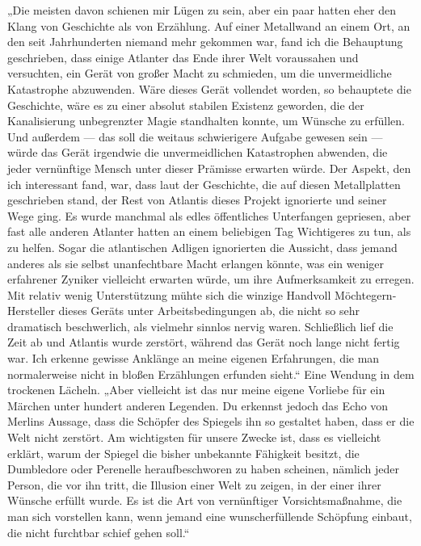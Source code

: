 „Die meisten davon schienen mir Lügen zu sein, aber ein paar hatten eher den Klang von Geschichte als von Erzählung. Auf einer Metallwand an einem Ort, an den seit Jahrhunderten niemand mehr gekommen war, fand ich die Behauptung geschrieben, dass einige Atlanter das Ende ihrer Welt voraussahen und versuchten, ein Gerät von großer Macht zu schmieden, um die unvermeidliche Katastrophe abzuwenden. Wäre dieses Gerät vollendet worden, so behauptete die Geschichte, wäre es zu einer absolut stabilen Existenz geworden, die der Kanalisierung unbegrenzter Magie standhalten konnte, um Wünsche zu erfüllen. Und außerdem — das soll die weitaus schwierigere Aufgabe gewesen sein — würde das Gerät irgendwie die unvermeidlichen Katastrophen abwenden, die jeder vernünftige Mensch unter dieser Prämisse erwarten würde. Der Aspekt, den ich interessant fand, war, dass laut der Geschichte, die auf diesen Metallplatten geschrieben stand, der Rest von Atlantis dieses Projekt ignorierte und seiner Wege ging. Es wurde manchmal als edles öffentliches Unterfangen gepriesen, aber fast alle anderen Atlanter hatten an einem beliebigen Tag Wichtigeres zu tun, als zu helfen. Sogar die atlantischen Adligen ignorierten die Aussicht, dass jemand anderes als sie selbst unanfechtbare Macht erlangen könnte, was ein weniger erfahrener Zyniker vielleicht erwarten würde, um ihre Aufmerksamkeit zu erregen. Mit relativ wenig Unterstützung mühte sich die winzige Handvoll Möchtegern-Hersteller dieses Geräts unter Arbeitsbedingungen ab, die nicht so sehr dramatisch beschwerlich, als vielmehr sinnlos nervig waren. Schließlich lief die Zeit ab und Atlantis wurde zerstört, während das Gerät noch lange nicht fertig war. Ich erkenne gewisse Anklänge an meine eigenen Erfahrungen, die man normalerweise nicht in bloßen Erzählungen erfunden sieht.“
Eine Wendung in dem trockenen Lächeln.
„Aber vielleicht ist das nur meine eigene Vorliebe für ein Märchen unter hundert anderen Legenden. Du erkennst jedoch das Echo von Merlins Aussage, dass die Schöpfer des Spiegels ihn so gestaltet haben, dass er die Welt nicht zerstört. Am wichtigsten für unsere Zwecke ist, dass es vielleicht erklärt, warum der Spiegel die bisher unbekannte Fähigkeit besitzt, die Dumbledore oder Perenelle heraufbeschworen zu haben scheinen, nämlich jeder Person, die vor ihn tritt, die Illusion einer Welt zu zeigen, in der einer ihrer Wünsche erfüllt wurde. Es ist die Art von vernünftiger Vorsichtsmaßnahme, die man sich vorstellen kann, wenn jemand eine wunscherfüllende Schöpfung einbaut, die nicht furchtbar schief gehen soll.“

